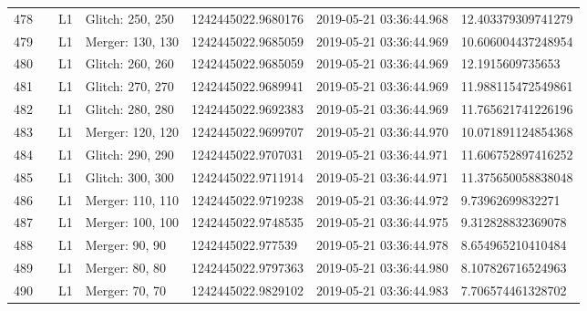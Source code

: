 \begin{longtable}{lllllll}
478  &                                                    &       L1 &  Glitch: 250, 250 &  1242445022.9680176 &  2019-05-21 03:36:44.968 &  12.403379309741279 \\
479  &                                                    &       L1 &  Merger: 130, 130 &  1242445022.9685059 &  2019-05-21 03:36:44.969 &  10.606004437248954 \\
480  &                                                    &       L1 &  Glitch: 260, 260 &  1242445022.9685059 &  2019-05-21 03:36:44.969 &    12.1915609735653 \\
481  &                                                    &       L1 &  Glitch: 270, 270 &  1242445022.9689941 &  2019-05-21 03:36:44.969 &  11.988115472549861 \\
482  &                                                    &       L1 &  Glitch: 280, 280 &  1242445022.9692383 &  2019-05-21 03:36:44.969 &  11.765621741226196 \\
483  &                                                    &       L1 &  Merger: 120, 120 &  1242445022.9699707 &  2019-05-21 03:36:44.970 &  10.071891124854368 \\
484  &                                                    &       L1 &  Glitch: 290, 290 &  1242445022.9707031 &  2019-05-21 03:36:44.971 &  11.606752897416252 \\
485  &                                                    &       L1 &  Glitch: 300, 300 &  1242445022.9711914 &  2019-05-21 03:36:44.971 &  11.375650058838048 \\
486  &                                                    &       L1 &  Merger: 110, 110 &  1242445022.9719238 &  2019-05-21 03:36:44.972 &    9.73962699832271 \\
487  &                                                    &       L1 &  Merger: 100, 100 &  1242445022.9748535 &  2019-05-21 03:36:44.975 &   9.312828832369078 \\
488  &                                                    &       L1 &    Merger: 90, 90 &   1242445022.977539 &  2019-05-21 03:36:44.978 &   8.654965210410484 \\
489  &                                                    &       L1 &    Merger: 80, 80 &  1242445022.9797363 &  2019-05-21 03:36:44.980 &   8.107826716524963 \\
490  &                                                    &       L1 &    Merger: 70, 70 &  1242445022.9829102 &  2019-05-21 03:36:44.983 &   7.706574461328702 \\

\end{longtable}
